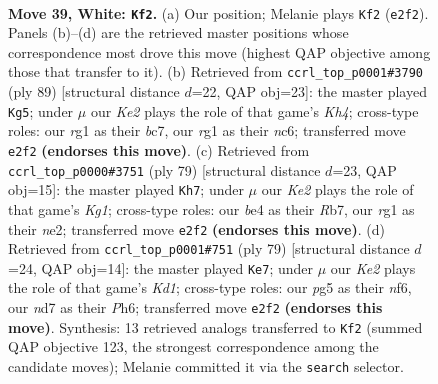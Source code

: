 \documentclass[11pt]{article}
\begin{document}
\clearpage

\begin{figure}[p]\centering
\begin{subfigure}{0.46\textwidth}\centering
\resizebox{\linewidth}{!}{%
\newchessgame
\chessboard[
  setfen={2k3n1/3n4/3b4/6p1/4b1Pp/7P/1p2K3/6r1 w - - 0 39},
  showmover=false,
  pgfstyle=straightmove, color=movearrow, markmove={e2-f2}
]}
\caption{}
\end{subfigure}\hfill
\begin{subfigure}{0.46\textwidth}\centering
\resizebox{\linewidth}{!}{%
\newchessgame
\chessboard[
  setfen={8/2B4p/2N2p2/2K1pP1k/8/P1n5/1n5P/8 b - - 3 45},
  showmover=false,
  pgfstyle=straightmove, color=movearrow, markmove={h5-g5}
]}
\caption{}
\end{subfigure}
\\[4pt]
\begin{subfigure}{0.46\textwidth}\centering
\resizebox{\linewidth}{!}{%
\newchessgame
\chessboard[
  setfen={6k1/1r6/7p/6p1/5p2/8/4NKPP/B7 b - - 1 40},
  showmover=false,
  pgfstyle=straightmove, color=movearrow, markmove={g8-h7}
]}
\caption{}
\end{subfigure}\hfill
\begin{subfigure}{0.46\textwidth}\centering
\resizebox{\linewidth}{!}{%
\newchessgame
\chessboard[
  setfen={3k4/8/4pN1p/5p2/r6P/3BP3/5P1K/8 b - - 1 40},
  showmover=false,
  pgfstyle=straightmove, color=movearrow, markmove={d8-e7}
]}
\caption{}
\end{subfigure}
\caption{\textbf{Move 39, White: \texttt{Kf2}.} (a) Our position; Melanie plays \texttt{Kf2} (\texttt{e2f2}). Panels (b)--(d) are the retrieved master positions whose correspondence most drove this move (highest QAP objective among those that transfer to it). (b) Retrieved from \texttt{ccrl\_top\_p0001\#3790} (ply 89) [structural distance $d$=22, QAP obj=23]: the master played \texttt{Kg5}; under $\mu$ our \emph{Ke2} plays the role of that game's \emph{Kh4}; cross-type roles: our \emph{r}g1 as their \emph{b}c7, our \emph{r}g1 as their \emph{n}c6; transferred move \texttt{e2f2} \textbf{(endorses this move)}. (c) Retrieved from \texttt{ccrl\_top\_p0000\#3751} (ply 79) [structural distance $d$=23, QAP obj=15]: the master played \texttt{Kh7}; under $\mu$ our \emph{Ke2} plays the role of that game's \emph{Kg1}; cross-type roles: our \emph{b}e4 as their \emph{R}b7, our \emph{r}g1 as their \emph{n}e2; transferred move \texttt{e2f2} \textbf{(endorses this move)}. (d) Retrieved from \texttt{ccrl\_top\_p0001\#751} (ply 79) [structural distance $d$=24, QAP obj=14]: the master played \texttt{Ke7}; under $\mu$ our \emph{Ke2} plays the role of that game's \emph{Kd1}; cross-type roles: our \emph{p}g5 as their \emph{n}f6, our \emph{n}d7 as their \emph{P}h6; transferred move \texttt{e2f2} \textbf{(endorses this move)}. Synthesis: 13 retrieved analogs transferred to \texttt{Kf2} (summed QAP objective 123, the strongest correspondence among the candidate moves); Melanie committed it via the \texttt{search} selector.}
\label{fig:thought-m76}
\end{figure}
\end{document}
